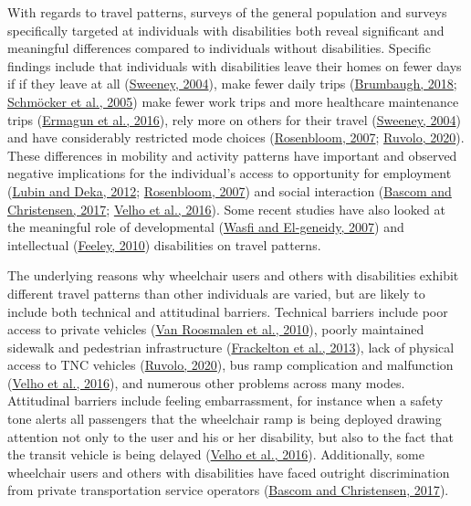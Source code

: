 \documentclass[3p, authoryear, review]{elsarticle} %
\begin{document}
With regards to travel patterns, surveys of the general population and surveys
specifically targeted at individuals with disabilities both reveal significant and
meaningful differences compared to individuals without disabilities. Specific
findings include that individuals with disabilities leave their homes on fewer
days if if they leave at all (\protect\hyperlink{ref-Sweeney2004}{Sweeney, 2004}), make fewer daily trips (\protect\hyperlink{ref-Brumbaugh2018}{Brumbaugh, 2018}; \protect\hyperlink{ref-Schmocker2005}{Schmöcker et al., 2005}) make fewer work trips and more healthcare maintenance trips
(\protect\hyperlink{ref-Ermagun2016}{Ermagun et al., 2016}), rely more on others for their travel (\protect\hyperlink{ref-Sweeney2004}{Sweeney, 2004})
and have considerably restricted mode choices (\protect\hyperlink{ref-Rosenbloom2007}{Rosenbloom, 2007}; \protect\hyperlink{ref-Ruvolo2020}{Ruvolo, 2020}).
These differences in mobility and activity patterns have important and observed
negative implications for the individual's access to opportunity for employment
(\protect\hyperlink{ref-Lubin2012}{Lubin and Deka, 2012}; \protect\hyperlink{ref-Rosenbloom2007}{Rosenbloom, 2007}) and social interaction (\protect\hyperlink{ref-Bascom2017}{Bascom and Christensen, 2017}; \protect\hyperlink{ref-Velho2016}{Velho et al., 2016}).
Some recent studies have also looked at the meaningful role of developmental (\protect\hyperlink{ref-Wasfi2007}{Wasfi and El-geneidy, 2007})
and intellectual (\protect\hyperlink{ref-Feeley2019}{Feeley, 2010}) disabilities on travel patterns.

The underlying reasons why wheelchair users and others with disabilities exhibit
different travel patterns than other individuals are varied, but are
likely to include both technical and attitudinal barriers. Technical barriers
include poor access to private vehicles
(\protect\hyperlink{ref-VanRoosmalen2010}{Van Roosmalen et al., 2010}), poorly maintained sidewalk and pedestrian infrastructure
(\protect\hyperlink{ref-frackelton2013measuring}{Frackelton et al., 2013}), lack of physical access to TNC
vehicles (\protect\hyperlink{ref-Ruvolo2020}{Ruvolo, 2020}), bus ramp complication and malfunction (\protect\hyperlink{ref-Velho2016}{Velho et al., 2016}),
and numerous other problems across many modes.
Attitudinal barriers include feeling embarrassment, for instance when a safety
tone alerts all passengers that the wheelchair ramp is being deployed drawing
attention not only to the user and his or her disability, but also to the fact that the
transit vehicle is being delayed (\protect\hyperlink{ref-Velho2016}{Velho et al., 2016}). Additionally, some wheelchair users
and others with disabilities have faced outright discrimination from private
transportation service operators (\protect\hyperlink{ref-Bascom2017}{Bascom and Christensen, 2017}).
\end{document}
